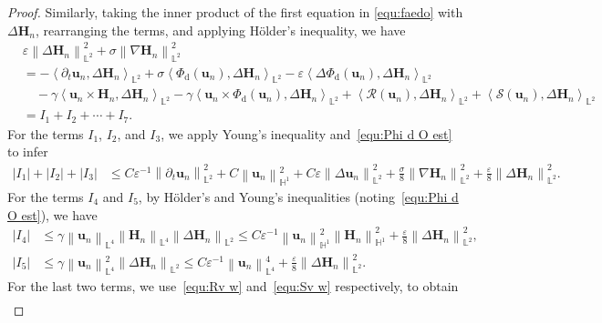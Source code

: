 \documentclass[11pt, reqno]{amsart}
\theoremstyle{definition}
\numberwithin{equation}{section}
\newcommand{\bff}{\boldsymbol}
\newcommand{\bb}{\mathbb}
\newcommand{\norm}[2]{\left\|{#1}\right\|_{#2}}
\newcommand{\inpro}[2]{\left\langle#1,#2\right\rangle}
\newcommand{\abs}[1]{\left|{#1}\right|}
\begin{document}
\begin{proof}
	Similarly, taking the inner product of the first equation in \eqref{equ:faedo} with $\Delta \bff{H}_n$, rearranging the terms, and applying H\"older's inequality, we have
	\begin{align}\label{equ:Delta Hn nab Hn L2}
		\nonumber
		&\varepsilon \norm{\Delta \bff{H}_n}{\bb{L}^2}^2 
		+
		\sigma \norm{\nabla \bff{H}_n}{\bb{L}^2}^2
		\\
		&=
		-
		\inpro{\partial_t \bff{u}_n}{\Delta \bff{H}_n}_{\bb{L}^2}
		+
		\sigma \inpro{\Phi_{\mathrm{d}}(\bff{u}_n)}{\Delta \bff{H}_n}_{\bb{L}^2}
		-
		\varepsilon \inpro{\Delta\Phi_{\mathrm{d}}(\bff{u}_n)}{\Delta \bff{H}_n}_{\bb{L}^2}
		\nonumber \\
		&\quad
		-
		\gamma \inpro{\bff{u}_n\times \bff{H}_n}{\Delta \bff{H}_n}_{\bb{L}^2}
		-
		\gamma \inpro{\bff{u}_n\times \Phi_{\mathrm{d}}(\bff{u}_n)}{\Delta \bff{H}_n}_{\bb{L}^2}
		+
		\inpro{\mathcal{R}(\bff{u}_n)}{\Delta \bff{H}_n}_{\bb{L}^2}
		+
		\inpro{\mathcal{S}(\bff{u}_n)}{\Delta \bff{H}_n}_{\bb{L}^2}
		\nonumber \\
		&= I_1+I_2+\cdots+I_7.
	\end{align}
	For the terms $I_1$, $I_2$, and $I_3$, we apply Young's inequality and~\eqref{equ:Phi d O est} to infer
	\begin{align*}
		\abs{I_1}+\abs{I_2}+\abs{I_3}
		&\leq
		C\varepsilon^{-1} \norm{\partial_t \bff{u}_n}{\bb{L}^2}^2
		+
        C\norm{\bff{u}_n}{\bb{H}^1}^2
        +
		C\varepsilon \norm{\Delta \bff{u}_n}{\bb{L}^2}^2
		+
        \frac{\sigma}{8} \norm{\nabla \bff{H}_n}{\bb{L}^2}^2
        +
		\frac{\varepsilon}{8} \norm{\Delta \bff{H}_n}{\bb{L}^2}^2.
	\end{align*}
	For the terms $I_4$ and $I_5$, by H\"older's and Young's inequalities (noting~\eqref{equ:Phi d O est}), we have
	\begin{align*}
		\abs{I_4}
		&\leq
		\gamma \norm{\bff{u}_n}{\bb{L}^4} \norm{\bff{H}_n}{\bb{L}^4}
		\norm{\Delta \bff{H}_n}{\bb{L}^2}
		\leq
		C\varepsilon^{-1} \norm{\bff{u}_n}{\bb{H}^1}^2 \norm{\bff{H}_n}{\bb{H}^1}^2
		+
		\frac{\varepsilon}{8} \norm{\Delta \bff{H}_n}{\bb{L}^2}^2,
		\\
		\abs{I_5}
		&\leq
		\gamma \norm{\bff{u}_n}{\bb{L}^4}^2 \norm{\Delta \bff{H}_n}{\bb{L}^2}
		\leq
		C \varepsilon^{-1} \norm{\bff{u}_n}{\bb{L}^4}^4 
		+
		\frac{\varepsilon}{8} \norm{\Delta \bff{H}_n}{\bb{L}^2}^2.
	\end{align*}
	For the last two terms, we use~\eqref{equ:Rv w} and~\eqref{equ:Sv w} respectively, to obtain
	\begin{align*}

\end{align*}
\end{proof}
\end{document}

